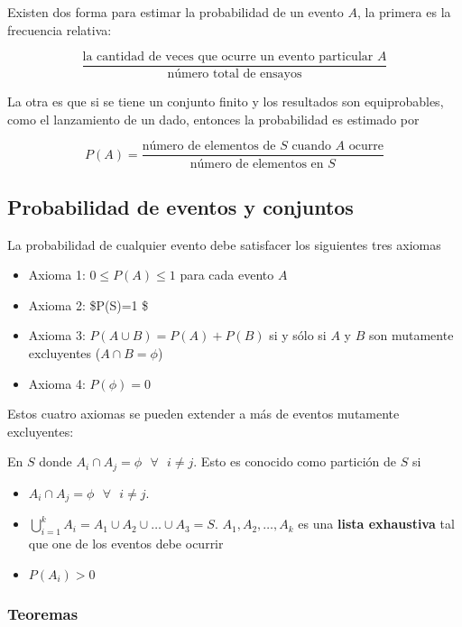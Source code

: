 \documentclass[11pt]{article}
\providecommand{\tightlist}{%
      \setlength{\itemsep}{0pt}\setlength{\parskip}{0pt}}
\begin{document}
Existen dos forma para estimar la probabilidad de un evento \(A\), la
primera es la frecuencia relativa:

\[ \frac{\text{la cantidad de veces que ocurre un evento particular } A}{\text{número total de ensayos}}\]

La otra es que si se tiene un conjunto finito y los resultados son
equiprobables, como el lanzamiento de un dado, entonces la probabilidad
es estimado por

\[ P(A)= \frac{\text{número de elementos de $S$ cuando $A$ ocurre}}{\text{número de elementos en $S$}}\]

\hypertarget{probabilidad-de-eventos-y-conjuntos}{%
\subsection{Probabilidad de eventos y
conjuntos}\label{probabilidad-de-eventos-y-conjuntos}}

La probabilidad de cualquier evento debe satisfacer los siguientes tres
axiomas

\begin{itemize}
\tightlist
\item
  Axioma 1: \(0 \leq P(A) \leq 1\) para cada evento \(A\)
\item
  Axioma 2: \$P(S)=1 \$
\item
  Axioma 3: \(P(A\cup B)=P(A)+P(B)\) si y sólo si \(A\) y \(B\) son
  mutamente excluyentes (\(A\cap B=\phi\))
\item
  Axioma 4: \(P(\phi)=0\)
\end{itemize}

Estos cuatro axiomas se pueden extender a más de eventos mutamente
excluyentes:

En \(S\) donde
\(A_{i} \cap A_{j} = \phi \text{  } \forall \text{  } i\neq j\). Esto es
conocido como partición de \(S\) si

\begin{itemize}
\tightlist
\item
  \(A_{i} \cap A_{j} = \phi \text{  } \forall \text{  } i\neq j\).
\item
  \(\bigcup\limits_{i=1}^{k} A_{i}= A_{1} \cup A_{2} \cup \ldots \cup A_{3}= S\).
  \(A_{1},A_{2}, \ldots ,A_{k}\) es una \textbf{lista exhaustiva} tal
  que one de los eventos debe ocurrir
\item
  \(P(A_{i})>0\)
\end{itemize}

\hypertarget{teoremas}{%
\subsubsection{Teoremas}\label{teoremas}}
\end{document}
